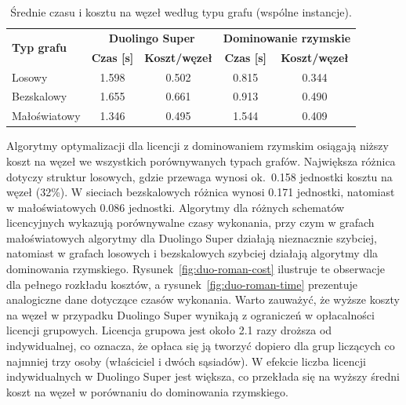 \begin{table}[H]
  \centering
  \caption{Średnie czasu i kosztu na węzeł według typu grafu (wspólne instancje).}
  \label{tab:duo-roman-graph}
  \begin{tabular}{lcccc}
    \toprule
    \multirow{2}{*}{\textbf{Typ grafu}} & \multicolumn{2}{c}{\textbf{Duolingo Super}} & \multicolumn{2}{c}{\textbf{Dominowanie rzymskie}}                                            \\
                                        & \textbf{Czas [s]}                           & \textbf{Koszt/węzeł}                              & \textbf{Czas [s]} & \textbf{Koszt/węzeł} \\
    \midrule
    Losowy                              & 1.598                                       & 0.502                                             & 0.815             & 0.344                \\
    Bezskalowy                          & 1.655                                       & 0.661                                             & 0.913             & 0.490                \\
    Małoświatowy                        & 1.346                                       & 0.495                                             & 1.544             & 0.409                \\
    \bottomrule
  \end{tabular}
\end{table}

Algorytmy optymalizacji dla licencji z dominowaniem rzymskim osiągają niższy koszt na węzeł we wszystkich porównywanych typach grafów. Największa różnica dotyczy struktur losowych, gdzie przewaga wynosi ok.~0.158 jednostki kosztu na węzeł (32\%). W sieciach bezskalowych różnica wynosi 0.171 jednostki, natomiast w małoświatowych 0.086 jednostki. Algorytmy dla różnych schematów licencyjnych wykazują porównywalne czasy wykonania, przy czym w grafach małoświatowych algorytmy dla Duolingo Super działają nieznacznie szybciej, natomiast w grafach losowych i bezskalowych szybciej działają algorytmy dla dominowania rzymskiego. Rysunek~\ref{fig:duo-roman-cost} ilustruje te obserwacje dla pełnego rozkładu kosztów, a rysunek~\ref{fig:duo-roman-time} prezentuje analogiczne dane dotyczące czasów wykonania. Warto zauważyć, że wyższe koszty na węzeł w przypadku Duolingo Super wynikają z ograniczeń w opłacalności licencji grupowych. Licencja grupowa jest około 2.1 razy droższa od indywidualnej, co oznacza, że opłaca się ją tworzyć dopiero dla grup liczących co najmniej trzy osoby (właściciel i dwóch sąsiadów). W efekcie liczba licencji indywidualnych w Duolingo Super jest większa, co przekłada się na wyższy średni koszt na węzeł w porównaniu do dominowania rzymskiego.

